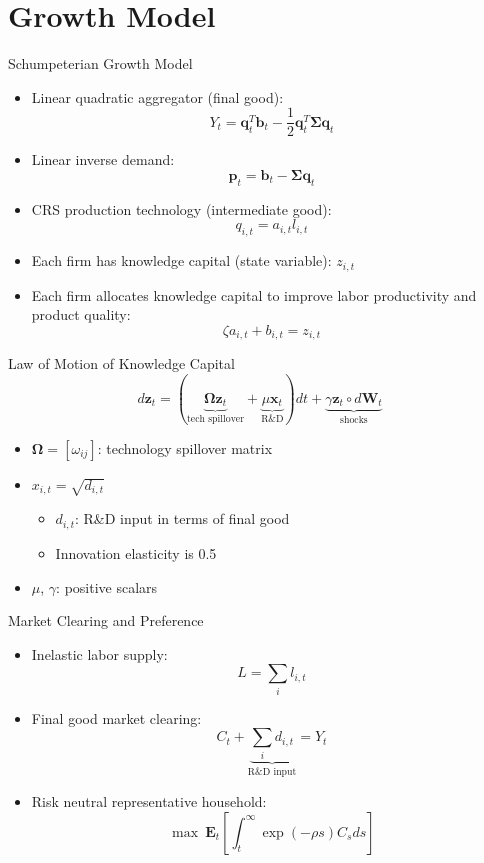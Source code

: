 \documentclass[
  10pt,               %
  aspectratio=169,    %
]{beamer}
\theoremstyle{plain}
\begin{document}
\section{Growth Model}
\begin{frame}{Schumpeterian Growth Model}

  \begin{itemize}
    \item Linear quadratic aggregator (final good):
          \[
            Y_{t}=\bm{q}_{t}^{T}\bm{b}_{t}-\frac{1}{2}\bm{q}_{t}^{T}\bm{\Sigma}\bm{q}_{t}
          \]
    \item Linear inverse demand:
          \[
            \bm{p}_{t}=\bm{b}_{t}-\bm{\Sigma}\bm{q}_{t}
          \]
    \item CRS production technology (intermediate good): \[q_{i,t}=a_{i,t}l_{i,t}\]
    \item Each firm has knowledge capital (state variable): $z_{i,t}$\medskip{}
    \item Each firm allocates knowledge capital to improve labor productivity
          and product quality:
          \[
            \zeta a_{i,t}+b_{i,t}=z_{i,t}
          \]
  \end{itemize}
\end{frame}
%
\begin{frame}{Law of Motion of Knowledge Capital}
  \[
    d\bm{z}_{t}=\left(\underbrace{\bm{\Omega}\bm{z}_{t}}_{\text{tech spillover}}+\underbrace{\mu\bm{x}_{t}}_{\text{R\&D}}\right)dt+\underbrace{\gamma\bm{z}_{t} \circ d\bm{W}_{t}}_{\text{shocks}}
  \]
  \begin{itemize}
    \item $\bm{\Omega}=\left[\omega_{ij}\right]$: technology spillover matrix\medskip{}
    \item $x_{i,t}=\sqrt{d_{i,t}}$
          \begin{itemize}
            \item $d_{i,t}$: R\&D input in terms of final good
            \item Innovation elasticity is 0.5\medskip{}
          \end{itemize}
    \item $\mu$, $\gamma$: positive scalars
  \end{itemize}
\end{frame}
%
\begin{frame}{Market Clearing and Preference}
  \begin{itemize}
    \item Inelastic labor supply:
          \[
            L=\sum_{i}l_{i,t}
          \]
    \item Final good market clearing:
          \[
            C_{t}+\underbrace{\sum_{i}d_{i,t}}_{\text{R\&D input}}=Y_{t}
          \]
    \item Risk neutral representative household:
          \[
            \max\ \bm{E}_{t}\left[\int_{t}^{\infty}\exp\left(-\rho s\right)C_{s}ds\right]
          \]
  \end{itemize}
\end{frame}
%
\end{document}
